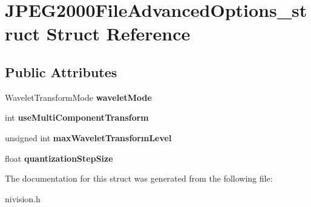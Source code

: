 \hypertarget{structJPEG2000FileAdvancedOptions__struct}{\section{\-J\-P\-E\-G2000\-File\-Advanced\-Options\-\_\-struct \-Struct \-Reference}
\label{structJPEG2000FileAdvancedOptions__struct}
}
\subsection*{\-Public \-Attributes}
\begin{DoxyCompactItemize}
\item 
\hypertarget{structJPEG2000FileAdvancedOptions__struct_a26787312431d4d8a9ccb310f35c3cdc5}{\-Wavelet\-Transform\-Mode {\bfseries wavelet\-Mode}}\label{structJPEG2000FileAdvancedOptions__struct_a26787312431d4d8a9ccb310f35c3cdc5}

\item 
\hypertarget{structJPEG2000FileAdvancedOptions__struct_aee18ba31f6a97bee18cc1537577c0af0}{int {\bfseries use\-Multi\-Component\-Transform}}\label{structJPEG2000FileAdvancedOptions__struct_aee18ba31f6a97bee18cc1537577c0af0}

\item 
\hypertarget{structJPEG2000FileAdvancedOptions__struct_a4650461874a0c22bb5144f66a77dccbe}{unsigned int {\bfseries max\-Wavelet\-Transform\-Level}}\label{structJPEG2000FileAdvancedOptions__struct_a4650461874a0c22bb5144f66a77dccbe}

\item 
\hypertarget{structJPEG2000FileAdvancedOptions__struct_a56f820232f42967cfa5c6205ff837a4d}{float {\bfseries quantization\-Step\-Size}}\label{structJPEG2000FileAdvancedOptions__struct_a56f820232f42967cfa5c6205ff837a4d}

\end{DoxyCompactItemize}


\-The documentation for this struct was generated from the following file\-:\begin{DoxyCompactItemize}
\item 
nivision.\-h\end{DoxyCompactItemize}
